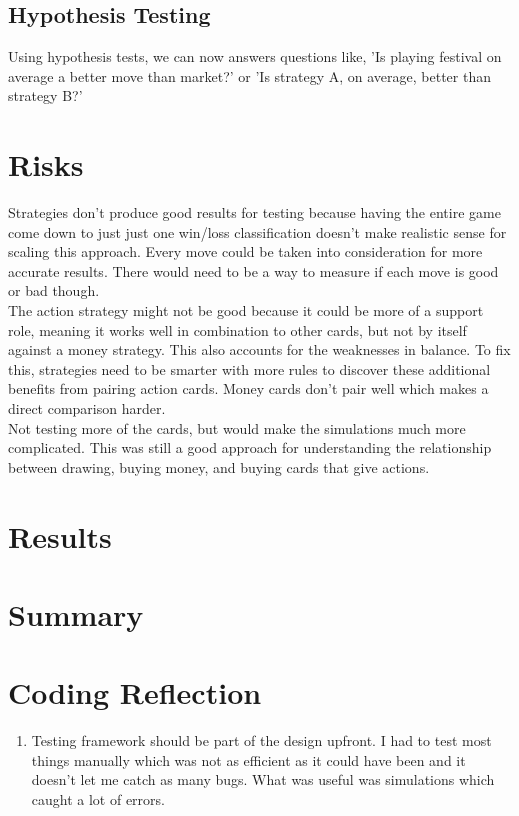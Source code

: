 \documentclass[11pt, oneside]{article}   	%
\begin{document}
\subsection{Hypothesis Testing}

Using hypothesis tests, we can now answers questions like, 'Is playing festival on average a better move than market?' or 'Is strategy A, on average, better than strategy B?'

\section{Risks}

Strategies don't produce good results for testing because having the entire game come down to just just one win/loss classification doesn't make realistic sense for scaling this approach. Every move could be taken into consideration for more accurate results. There would need to be a way to measure if each move is good or bad though. 
\\
The action strategy might not be good because it could be more of a support role, meaning it works well in combination to other cards, but not by itself against a money strategy. This also accounts for the weaknesses in balance. To fix this, strategies need to be smarter with more rules to discover these additional benefits from pairing action cards. Money cards don't pair well which makes a direct comparison harder. 
\\
Not testing more of the cards, but would make the simulations much more complicated. This was still a good approach for understanding the relationship between drawing, buying money, and buying cards that give actions.

\section{Results}

\section{Summary}

\section{Coding Reflection}

	\begin{enumerate}
 		 \item Testing framework should be part of the design upfront. I had to test most things manually which was not as efficient as it could have been and it doesn't let me catch as many bugs. What was useful was simulations which caught a lot of errors. 
	\end{enumerate}
\end{document}
